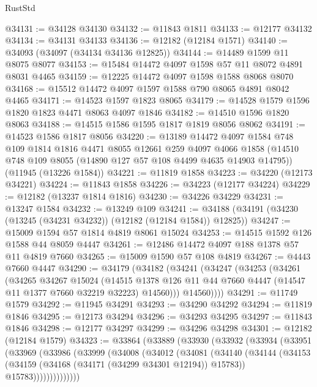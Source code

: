 \begin{lexlean}{RustStd}
\begin{coremodule}
@34131 := @34128 @34130
@34132 := @11843 @1811
@34133 := @12177 @34132
@34134 := @34131 @34133
@34136 := @12182 (@12184 @1571)
@34140 := @34093 (@34097 (@34134 @34136 @12825))
@34144 := @14489 @1599 @11 @8075 @8077
@34153 := @15484 @14472 @4097 @1598 @57 @11 @8072 @4891 @8031 @4465
@34159 := @12225 @14472 @4097 @1598 @1588 @8068 @8070
@34168 := @15512 @14472 @4097 @1597 @1588 @790 @8065 @4891 @8042 @4465
@34171 := @14523 @1597 @1823 @8065
@34179 := @14528 @1579 @1596 @1820 @1823 @4471 @8063 @4097 @1846
@34182 := @14510 @1596 @1820 @8063
@34188 := @14515 @1586 @1595 @1817 @1819 @8056 @8062
@34191 := @14523 @1586 @1817 @8056
@34220 := @13189
    @14472
    @4097
    @1584
    @748
    @109
    @1814
    @1816
    @4471
    @8055
    @12661
    @259
    @4097
    @4066
    @1858
    (@14510 @748 @109 @8055 (@14890 @127 @57 @108 @4499 @4635 @14903 @14795))
    (@11945 (@13226 @1584))
@34221 := @11819 @1858
@34223 := @34220 (@12173 @34221)
@34224 := @11843 @1858
@34226 := @34223 (@12177 @34224)
@34229 := @12182 (@13237 @1814 @1816)
@34230 := @34226 @34229
@34231 := @13247 @1584
@34232 := @13249 @109
@34241 := @34188 (@34191 (@34230 (@13245 (@34231 @34232)) (@12182 (@12184 @1584)) @12825))
@34247 := @15009 @1594 @57 @1814 @4819 @8061 @15024
@34253 := @14515 @1592 @126 @1588 @44 @8059 @4447
@34261 := @12486 @14472 @4097 @188 @1378 @57 @11 @4819 @7660
@34265 := @15009 @1590 @57 @108 @4819
@34267 := @4443 @7660 @4447
@34290 := @34179
    (@34182
      (@34241
        (@34247
          (@34253
            (@34261
              (@34265
                @34267
                @15024
                (@14515
                  @1378
                  @126
                  @11
                  @44
                  @7660
                  @4447
                  (@14547 @11 @1377 @7660 @32219 @32223)
                  @14560)))
            @14560))))
@34291 := @11749 @1579
@34292 := @11945 @34291
@34293 := @34290 @34292
@34294 := @11819 @1846
@34295 := @12173 @34294
@34296 := @34293 @34295
@34297 := @11843 @1846
@34298 := @12177 @34297
@34299 := @34296 @34298
@34301 := @12182 (@12184 @1579)
@34323 := @33864
    (@33889
      (@33930
        (@33932
          (@33934
            (@33951
              (@33969
                (@33986
                  (@33999
                    (@34008
                      (@34012
                        (@34081
                          (@34140
                            (@34144
                              (@34153
                                (@34159 (@34168 (@34171 (@34299 @34301 @12194)) @15783))
                                @15783))))))))))))))

\end{coremodule}
\end{lexlean}
